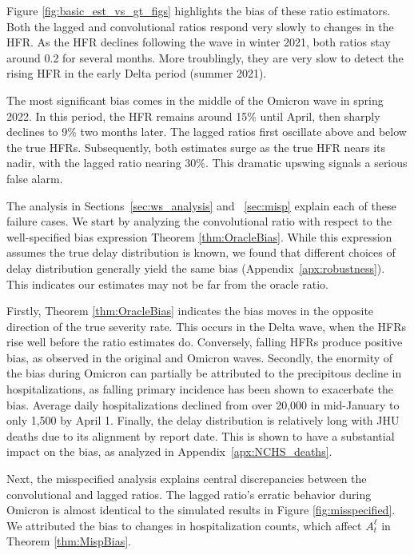 \documentclass{article}
\begin{document}
Figure \ref{fig:basic_est_vs_gt_figs} highlights the bias of these ratio estimators. Both the lagged and convolutional ratios respond very slowly to changes in the HFR. As the HFR declines following the wave in winter 2021, both ratios stay around 0.2 for several months. More troublingly, they are very slow to detect the rising HFR in the early Delta period (summer 2021). %

The most significant bias comes in the middle of the Omicron wave in spring 2022. 
In this period, the HFR remains around 15\% until April, then sharply declines to 9\% two months later. The lagged ratios first oscillate above and below the true HFRs. Subsequently, both estimates surge as the true HFR nears its nadir, with the lagged ratio nearing 30\%. This dramatic upswing signals a serious false alarm. 

The analysis in Sections~\ref{sec:ws_analysis} and ~\ref{sec:misp} explain each of these failure cases. We start by analyzing the convolutional ratio with respect to the well-specified bias expression Theorem \ref{thm:OracleBias}. While this expression assumes the true delay distribution is known, we found that different choices of delay distribution generally yield the same bias (Appendix~\ref{apx:robustness}). This indicates our estimates may not be far from the oracle ratio.

Firstly, Theorem \ref{thm:OracleBias} indicates the bias moves in the opposite direction of the true severity rate. This occurs in the Delta wave, when the HFRs rise well before the ratio estimates do. Conversely, falling HFRs produce positive bias, as observed in the original and Omicron waves.
Secondly, the enormity of the bias during Omicron can partially be attributed to the precipitous decline in hospitalizations, as falling primary incidence has been shown to exacerbate the bias. Average daily hospitalizations declined from over 20,000 in mid-January to only 1,500 by April 1. 
Finally, the delay distribution is relatively long with JHU deaths due to its alignment by report date. This is shown to have a substantial impact on the bias, as analyzed in Appendix~\ref{apx:NCHS_deaths}.

Next, the misspecified analysis explains central discrepancies between the convolutional and lagged ratios. The lagged ratio's erratic behavior during Omicron is almost identical to the simulated results in Figure \ref{fig:misspecified}. We attributed the bias to changes in hospitalization counts, which affect $A_t^\ell$ in Theorem \ref{thm:MispBias}.
\end{document}
